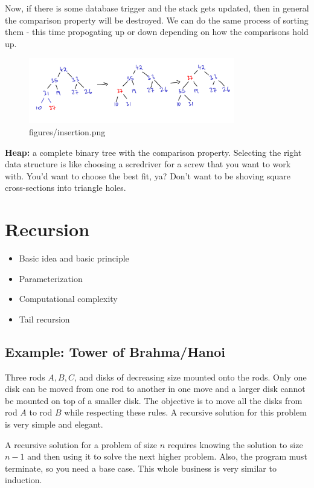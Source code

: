 \documentclass[a4paper]{article}
\begin{document}
Now, if there is some database trigger and the stack gets updated,
then in general the comparison property will be destroyed. We can
do the same process of sorting them - this time propogating up or
down depending on how the comparisons hold up.

\begin{figure}[h]
	\centering
	\includegraphics[width=0.8\textwidth]{figures/insertion.png}
	\caption{figures/insertion.png}
	\label{fig: (TODO: verify whether this is right lol) Inserting to heap}
\end{figure}

\textbf{Heap:} a complete binary tree with the comparison property.
Selecting the right data structure is like choosing a scredriver
for a screw that you want to work with. You'd want to choose the best
fit, ya? Don't want to be shoving square cross-sections into triangle
holes.

\section{Recursion}
\begin{itemize}
	\item Basic idea and basic principle
	\item Parameterization
	\item Computational complexity
	\item Tail recursion
\end{itemize}

\subsection*{Example: Tower of Brahma/Hanoi}
Three rods $A, B, C$, and disks of decreasing size mounted onto the 
rods. Only one disk can be moved from one rod to another in one move 
and a larger disk cannot
be mounted on top of a smaller disk. The objective is to move all the
disks from rod $A$ to rod $B$ while respecting these rules.
A recursive solution for this problem is very simple and elegant.

A recursive solution for a problem of size $n$ requires knowing the
solution to size $n-1$ and then using it to solve the next higher
problem. Also, the program must terminate, so you need a base case.
This whole business is very similar to induction.
\end{document}
